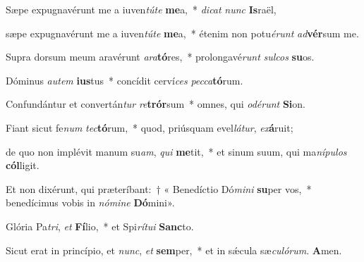 \item Sæpe expugnavérunt me a iuven\textit{túte} \textbf{me}a,~* \textit{dicat} \textit{nunc} \textbf{Is}raël,

\item sæpe expugnavérunt me a iuven\textit{túte} \textbf{me}a,~* étenim non potu\textit{érunt} \textit{ad}\textbf{vér}sum me.

\item Supra dorsum meum aravérunt \textit{ara}\textbf{tó}res,~* prolongavé\textit{runt} \textit{sulcos} \textbf{su}os.

\item Dóminus \textit{autem} \textbf{ius}tus~* concídit cerví\textit{ces} \textit{pecca}\textbf{tó}rum.

\item Confundántur et convertán\textit{tur} \textit{re}\textbf{trór}sum~* omnes, qui \textit{odérunt} \textbf{Si}on.

\item Fiant sicut fe\textit{num} \textit{tec}\textbf{tó}rum,~* quod, priúsquam evel\textit{látur}, \textit{ex}\textbf{á}ruit;

\item de quo non implévit manum su\textit{am}, \textit{qui} \textbf{me}tit,~* et sinum suum, qui ma\textit{nípulos} \textbf{cól}ligit.

\item Et non dixérunt, qui præteríbant:~† « Benedíctio Dó\textit{mini} \textbf{su}per vos,~* benedícimus vobis in \textit{nómine} \textbf{Dó}mini».

\item Glória Pa\textit{tri}, \textit{et} \textbf{Fí}lio,~* et Spi\textit{rítui} \textbf{Sanc}to.

\item Sicut erat in princípio, et \textit{nunc}, \textit{et} \textbf{sem}per,~* et in sǽcula sæ\textit{culórum}. \textbf{A}men.